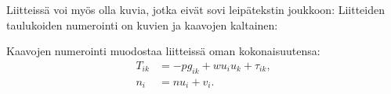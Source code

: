 \documentclass[english, 12pt, a4paper, elec, utf8, a-1b, online]{aaltothesis}
\begin{document}

Liitteiss\"a voi my\"os olla kuvia, jotka
eiv\"at sovi leip\"atekstin joukkoon:
Liitteiden taulukoiden numerointi on kuvien ja kaavojen kaltainen:
\begin{table}[htb]
\caption{Taulukon kuvateksti.}
\label{liitetaulukko}
\begin{center}
\end{center}
\end{table}
Kaavojen numerointi muodostaa liitteiss\"a oman kokonaisuutensa:
\begin{align}
T_{ik} &= -p g_{ik} + w u_i u_k + \tau_{ik},  \label{liitekaava3} \\
n_i    &= n u_i + v_i.                      \label{liitekaava4}
\end{align}
\end{document}
